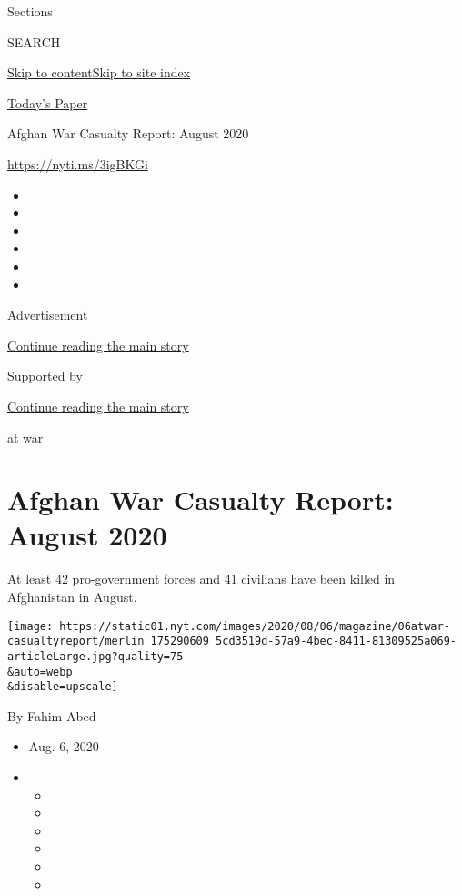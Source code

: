 Sections

SEARCH

\protect\hyperlink{site-content}{Skip to
content}\protect\hyperlink{site-index}{Skip to site index}

\href{https://myaccount.nytimes.com/auth/login?response_type=cookie\&client_id=vi}{}

\href{https://www.nytimes.com/section/todayspaper}{Today's Paper}

Afghan War Casualty Report: August 2020

\href{https://nyti.ms/3igBKGi}{https://nyti.ms/3igBKGi}

\begin{itemize}
\item
\item
\item
\item
\item
\item
\end{itemize}

Advertisement

\protect\hyperlink{after-top}{Continue reading the main story}

Supported by

\protect\hyperlink{after-sponsor}{Continue reading the main story}

at war

\hypertarget{afghan-war-casualty-report-august-2020}{%
\section{Afghan War Casualty Report: August
2020}\label{afghan-war-casualty-report-august-2020}}

At least 42 pro-government forces and 41 civilians have been killed in
Afghanistan in August.

\texttt{[image: https://static01.nyt.com/images/2020/08/06/magazine/06atwar-casualtyreport/merlin\_175290609\_5cd3519d-57a9-4bec-8411-81309525a069-articleLarge.jpg?quality=75\\\&auto=webp\\\&disable=upscale]}

By Fahim Abed

\begin{itemize}
\item
  Aug. 6, 2020
\item
  \begin{itemize}
  \item
  \item
  \item
  \item
  \item
  \item
  \end{itemize}
\end{itemize}

